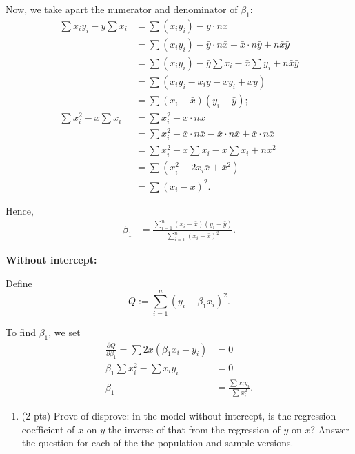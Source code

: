 \documentclass[
]{article}
\providecommand{\tightlist}{%
  \setlength{\itemsep}{0pt}\setlength{\parskip}{0pt}}
\begin{document}
Now, we take apart the numerator and denominator of \(\beta_1\):
\begin{align*}
    \sum x_iy_i - \bar{y}\sum x_i & = \sum (x_iy_i) - \bar{y}\cdot n\bar{x} \\
    & = \sum (x_iy_i) - \bar{y}\cdot n\bar{x}  - \bar{x}\cdot n\bar{y} + n\bar{x}\bar{y} \\
    & = \sum (x_iy_i) - \bar{y}\sum x_i - \bar{x}\sum y_i + n\bar{x}\bar{y} \\
    & = \sum\left(x_iy_i - x_i\bar{y} - \bar{x}y_i + \bar{x}\bar{y}\right) \\
    & = \sum(x_i-\bar{x})(y_i-\bar{y}); \\
    \sum x_i^2 - \bar{x}\sum x_i & = \sum x_i^2 - \bar{x}\cdot n\bar{x} \\
    & = \sum x_i^2 - \bar{x}\cdot n\bar{x} - \bar{x}\cdot n\bar{x} + \bar{x}\cdot n\bar{x} \\
    & = \sum x_i^2 - \bar{x}\sum x_i - \bar{x}\sum x_i + n\bar{x}^2 \\
    & = \sum\left(x_i^2 - 2x_i\bar{x} + \bar{x}^2\right) \\
    & = \sum(x_i-\bar{x})^2.
\end{align*}

Hence, \begin{align*}
    \beta_1 & = \frac{\sum_{i=1}^n(x_i-\bar{x})(y_i-\bar{y})}{\sum_{i=1}^n(x_i-\bar{x})^2}.
\end{align*}

\textbf{Without intercept:}

Define \[Q:=\sum_{i=1}^n(y_i-\beta_1x_i)^2.\]

To find \(\beta_1\), we set \begin{align*}
    \frac{\partial Q}{\partial \beta_1} = \sum 2x(\beta_1x_i-y_i) & = 0 \\
    \beta_1\sum x_i^2 - \sum x_iy_i & = 0 \\
    \beta_1 & = \frac{\sum x_iy_i}{\sum x_i^2}.
\end{align*}

\begin{enumerate}
\def\labelenumi{\arabic{enumi}.}
\setcounter{enumi}{2}
\tightlist
\item
  (2 pts) Prove of disprove: in the model without intercept, is the
  regression coefficient of \(x\) on \(y\) the inverse of that from the
  regression of \(y\) on \(x\)? Answer the question for each of the the
  population and sample versions.
\end{enumerate}
\end{document}
